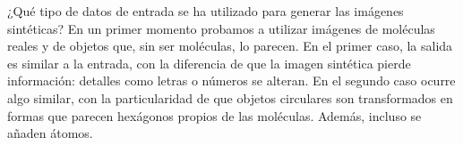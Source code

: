 \begin{figure}[H]
\centering
\end{figure}

¿Qué tipo de datos de entrada se ha utilizado para generar las imágenes sintéticas? En un primer momento probamos a utilizar imágenes de moléculas reales y de objetos que, sin ser moléculas, lo parecen. En el primer caso, la salida es similar a la entrada, con la diferencia de que la imagen sintética pierde información: detalles como letras o números se alteran. En el segundo caso ocurre algo similar, con la particularidad de que objetos circulares son transformados en formas que parecen hexágonos propios de las moléculas. Además, incluso se añaden átomos.

